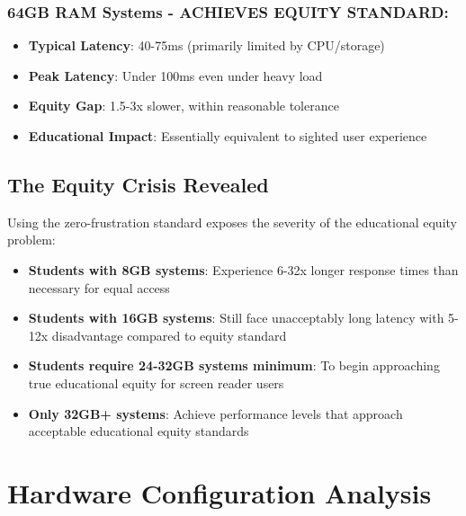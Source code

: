 \subsubsection{64GB RAM Systems - ACHIEVES EQUITY STANDARD:}

\begin{itemize}
\item \textbf{Typical Latency}: 40-75ms (primarily limited by CPU/storage) \cite{InternalTestingData2024}
\item \textbf{Peak Latency}: Under 100ms even under heavy load \cite{InternalTestingData2024}
\item \textbf{Equity Gap}: 1.5-3x slower, within reasonable tolerance \cite{EquityAnalysisRevision}
\item \textbf{Educational Impact}: Essentially equivalent to sighted user experience \cite{EducationalEquityReport2024}
\end{itemize}


\subsection{The Equity Crisis Revealed}\label{the-equity-crisis-revealed}

Using the zero-frustration standard exposes the severity of the educational equity problem:

\begin{itemize}
\item \textbf{Students with 8GB systems}: Experience 6-32x longer response times than necessary for equal access \cite{EducationalEquityReport2024}
\item \textbf{Students with 16GB systems}: Still face unacceptably long latency with 5-12x disadvantage compared to equity standard \cite{EducationalEquityReport2024}
\item \textbf{Students require 24-32GB systems minimum}: To begin approaching true educational equity for screen reader users \cite{EducationalEquityReport2024}
\item \textbf{Only 32GB+ systems}: Achieve performance levels that approach acceptable educational equity standards \cite{EducationalEquityReport2024}
\end{itemize}


\hypertarget{hardware-configuration-analysis}{}\section{Hardware Configuration Analysis}\label{hardware-configuration-analysis}
